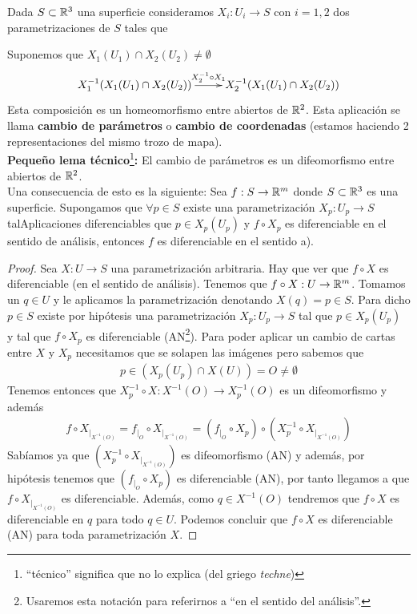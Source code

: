 \begin{ejemplo}
\begin{enumerate}
        Dada $S\subset \mathbb{R}^3$ una superficie consideramos $X_i:U_i\to S$ con $i=1,2$ dos parametrizaciones de $S$ tales que 

        Suponemos que $X_1(U_1)\cap X_2(U_2) \neq \emptyset$
        \begin{gather*}
            \xymatrix{
                X_1^{-1} (X_1(U_1)\cap X_2(U_2)) \ar[r]^{X_2^{-1}\circ X_1} & X_2^{-1} (X_1(U_1)\cap X_2(U_2))
            }
        \end{gather*}
        Esta composición es un homeomorfismo entre abiertos de $\mathbb{R}^2$. Esta aplicación se llama \textbf{cambio de parámetros} o \textbf{cambio de coordenadas} (estamos haciendo 2 representaciones del mismo trozo de mapa). \\

        \textbf{Pequeño lema técnico}\footnote{``técnico'' significa que no lo explica (del griego \textit{techne})}\textbf{:} El cambio de parámetros es un difeomorfismo entre abiertos de $\mathbb{R}^2$.\\

        Una consecuencia de esto es la siguiente: Sea $f:S\to \mathbb{R}^m$ donde $S \subset \mathbb{R}^3$ es una superficie. Supongamos que $\forall p \in S$ existe una parametrización $X_p:U_p\to S$ talAplicaciones diferenciables que $p\in X_p(U_p)$ y $f\circ X_p$ es diferenciable en el sentido de análisis, entonces $f$ es diferenciable en el sentido a).
        \begin{proof}
            Sea $X:U\to S$ una parametrización arbitraria. Hay que ver que $f\circ X$ es diferenciable (en el sentido de análisis). Tenemos que $f\circ X : U \to \mathbb{R}^m$. Tomamos un $q\in U$ y le aplicamos la parametrización denotando $X(q)=p\in S$. Para dicho $p\in S$ existe por hipótesis una parametrización $X_p:U_p\to S$ tal que $p\in X_p(U_p)$ y tal que $f\circ X_p$ es diferenciable (AN\footnote{Usaremos esta notación para referirnos a ``en el sentido del análisis''.}). Para poder aplicar un cambio de cartas entre $X$ y $X_p$ necesitamos que se solapen las imágenes pero sabemos que 
            \begin{gather*}
                p\in (X_p(U_p)\cap X(U))=O \neq \emptyset
            \end{gather*}
            Tenemos entonces que $X_p^{-1}\circ X: X^{-1}(O)\to X_p^{-1}(O)$ es un difeomorfismo y además
            \begin{gather*}
                f\circ X_{|_{X^{-1}(O)}} = f_{|_O}\circ X_{|_{X^{-1}(O)}} = (f_{|_O}\circ X_p) \circ (X_p^{-1} \circ X_{|_{X^{-1}(O)}})
            \end{gather*}
            Sabíamos ya que $(X_p^{-1} \circ X_{|_{X^{-1}(O)}})$ es difeomorfismo (AN) y además, por hipótesis tenemos que $(f_{|_O}\circ X_p)$ es diferenciable (AN), por tanto llegamos a que $f\circ X_{|_{X^{-1}(O)}}$ es diferenciable. Además, como $q\in X^{-1}(O)$ tendremos que $f\circ X$ es diferenciable en $q$ para todo $q\in U$. Podemos concluir que $f\circ X$ es diferenciable (AN) para toda parametrización $X$.
        \end{proof}


\end{enumerate}
\end{ejemplo}
